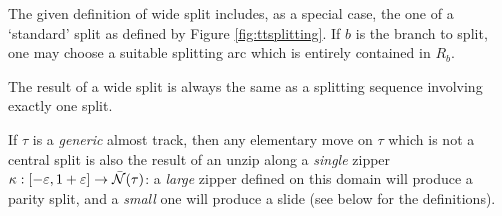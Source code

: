 \begin{rmk}\label{rmk:generic_move_as_unzip}
The given definition of wide split includes, as a special case, the one of a `standard' split as defined by Figure \ref{fig:ttsplitting}. If $b$ is the branch to split, one may choose a suitable splitting arc which is entirely contained in $R_b$.

The result of a wide split is always the same as a splitting sequence involving exactly one split.

If $\tau$ is a \emph{generic} almost track, then any elementary move on $\tau$ which is not a central split is also the result of an unzip along a \emph{single} zipper $\kappa: [-\varepsilon, 1+\varepsilon]\rightarrow \bar{{\mathcal N}}(\tau)$: a \emph{large} zipper defined on this domain will produce a parity split, and a \emph{small} one will produce a slide (see below for the definitions).
\end{rmk}

